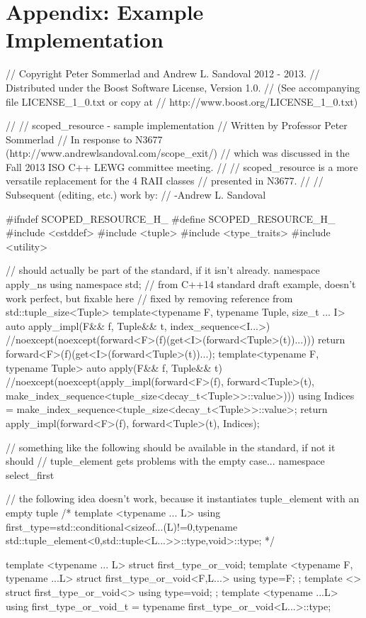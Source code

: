 \documentclass[ebook,11pt,article]{memoir}
\begin{document}
\chapter{Appendix: Example Implementation}
\begin{codeblock}
// Copyright Peter Sommerlad and Andrew L. Sandoval 2012 - 2013.
// Distributed under the Boost Software License, Version 1.0.
//   (See accompanying file LICENSE_1_0.txt or copy at
//         http://www.boost.org/LICENSE_1_0.txt)

//
// scoped_resource - sample implementation
// Written by Professor Peter Sommerlad
// In response to N3677 (http://www.andrewlsandoval.com/scope_exit/)
// which was discussed in the Fall 2013 ISO C++ LEWG committee meeting.
//
// scoped_resource is a more versatile replacement for the 4 RAII classes
// presented in N3677.
//
// Subsequent (editing, etc.) work by:
// -Andrew L. Sandoval


#ifndef SCOPED_RESOURCE_H_
#define SCOPED_RESOURCE_H_
#include <cstddef>
#include <tuple>
#include <type_traits>
#include <utility>

// should actually be part of the standard, if it isn't already.
namespace apply_ns{
using namespace std;
// from C++14 standard draft example, doesn't work perfect, but fixable here
// fixed by removing reference from std::tuple_size<Tuple>
template<typename F, typename Tuple, size_t ... I>
auto apply_impl(F&& f, Tuple&& t, index_sequence<I...>)
//noexcept(noexcept(forward<F>(f)(get<I>(forward<Tuple>(t))...)))
{
	return forward<F>(f)(get<I>(forward<Tuple>(t))...);
}
template<typename F, typename Tuple>
auto apply(F&& f, Tuple&& t)
//noexcept(noexcept(apply_impl(forward<F>(f), forward<Tuple>(t), make_index_sequence<tuple_size<decay_t<Tuple>>::value>{})))
{
  using Indices = make_index_sequence<tuple_size<decay_t<Tuple>>::value>;
  return apply_impl(forward<F>(f), forward<Tuple>(t), Indices{});
}
}

// something like the following should be available in the standard, if not it should
// tuple_element gets problems with the empty case...
namespace select_first{
// the following idea doesn't work, because it instantiates tuple_element with an empty tuple
/*
template <typename ... L>
using first_type=std::conditional<sizeof...(L)!=0,typename std::tuple_element<0,std::tuple<L...>>::type,void>::type;
 */

template <typename ... L> struct first_type_or_void;
template <typename F, typename ...L>
struct first_type_or_void<F,L...>{
	using type=F;
};
template <> struct first_type_or_void<>{
	using type=void;
};
template <typename ...L>
using first_type_or_void_t = typename first_type_or_void<L...>::type;
}


\end{codeblock}
\end{document}

